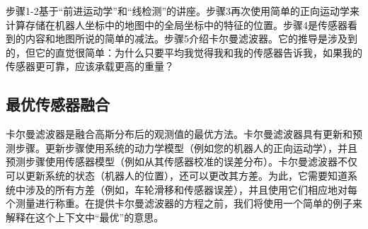 
步骤1-2基于“前进运动学”和“线检测”的讲座。步骤3再次使用简单的正向运动学来计算存储在机器人坐标中的地图中的全局坐标中的特征的位置。步骤4是传感器看到的内容和地图所说的简单的减法。步骤5介绍卡尔曼滤波器。它的推导是涉及到的，但它的直觉很简单：为什么只要平均我觉得我和我的传感器告诉我，如果我的传感器更可靠，应该承载更高的重量？




\subsection{最优传感器融合}
卡尔曼滤波器是融合高斯分布后的观测值的最优方法。卡尔曼滤波器具有更新和预测步骤。更新步骤使用系统的动力学模型（例如您的机器人的正向运动学），并且预测步骤使用传感器模型（例如从其传感器校准的误差分布）。卡尔曼滤波器不仅可以更新系统的状态（机器人的位置），还可以更改其方差。为此，它需要知道系统中涉及的所有方差（例如，车轮滑移和传感器误差），并且使用它们相应地对每个测量进行称重。在提供卡尔曼滤波器的方程之前，我们将使用一个简单的例子来解释在这个上下文中“最优”的意思。

